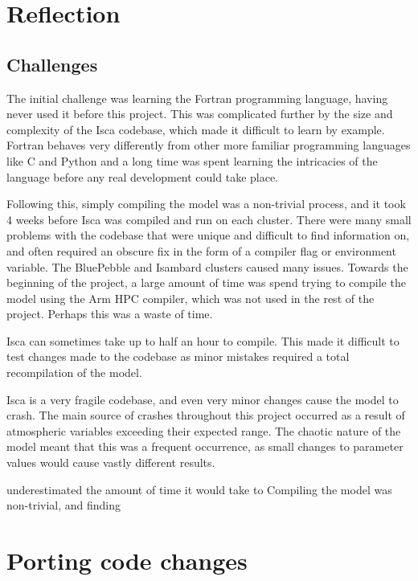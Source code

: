 \documentclass[a4paper,11pt]{report}
\begin{document}
\chapter{Reflection}

\section{Challenges}
The initial challenge was learning the Fortran programming language, having never used it before this project. This was complicated further by the size and complexity of the Isca codebase, which made it difficult to learn by example. Fortran behaves very differently from other more familiar programming languages like C and Python and a long time was spent learning the intricacies of the language before any real development could take place.
\par
Following this, simply compiling the model was a non-trivial process, and it took 4 weeks before Isca was compiled and run on each cluster. There were many small problems with the codebase that were unique and difficult to find information on, and often required an obscure fix in the form of a compiler flag or environment variable. The BluePebble and Isambard clusters caused many issues. Towards the beginning of the project, a large amount of time was spend trying to compile the model using the Arm HPC compiler, which was not used in the rest of the project. Perhaps this was a waste of time. 
\par
Isca can sometimes take up to half an hour to compile. This made it difficult to test changes made to the codebase as minor mistakes required a total recompilation of the model.
\par
Isca is a very fragile codebase, and even very minor changes cause the model to crash. The main source of crashes throughout this project occurred as a result of atmospheric variables exceeding their expected range. The chaotic nature of the model meant that this was a frequent occurrence, as small changes to parameter values would cause vastly different results. 

 underestimated the amount of time it would take to 
Compiling the model was non-trivial, and finding 










\appendix
\chapter{Porting code changes}
\label{apdx:porting}
\end{document}
